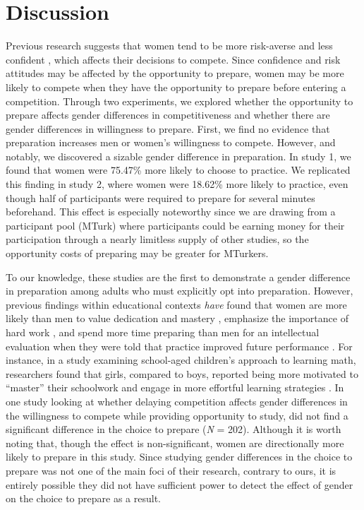\documentclass[a4paper, nobind]{templates/ociamthesis}
\begin{document}
\hypertarget{discussion}{%
\chapter{Discussion}\label{discussion}}

Previous research suggests that women tend to be more risk-averse \autocite{Croson2009,Dohmen2011b,Eckel2008,Bertrand2010a} and less confident \autocite{Bertrand2010,Lundeberg1994,Mobius2011,Barber2001,Croson2009}, which affects their decisions to compete. Since confidence and risk attitudes may be affected by the opportunity to prepare, women may be more likely to compete when they have the opportunity to prepare before entering a competition. Through two experiments, we explored whether the opportunity to prepare affects gender differences in competitiveness and whether there are gender differences in willingness to prepare. First, we find no evidence that preparation increases men or women's willingness to compete. However, and notably, we discovered a sizable gender difference in preparation. In study 1, we found that women were 75.47\% more likely to choose to practice. We replicated this finding in study 2, where women were 18.62\% more likely to practice, even though half of participants were required to prepare for several minutes beforehand. This effect is especially noteworthy since we are drawing from a participant pool (MTurk) where participants could be earning money for their participation through a nearly limitless supply of other studies, so the opportunity costs of preparing may be greater for MTurkers.

To our knowledge, these studies are the first to demonstrate a gender difference in preparation among adults who must explicitly opt into preparation. However, previous findings within educational contexts \emph{have} found that women are more likely than men to value dedication and mastery \autocite{Leslie2015,Kenney-Benson2006}, emphasize the importance of hard work \autocite{Mccrea2008,Hirt2009,Mccrea2008a}, and spend more time preparing than men for an intellectual evaluation when they were told that practice improved future performance \autocite{Kimble2005}. For instance, in a study examining school-aged children's approach to learning math, researchers found that girls, compared to boys, reported being more motivated to ``master'' their schoolwork and engage in more effortful learning strategies \autocite{Kenney-Benson2006}. In one study looking at whether delaying competition affects gender differences in the willingness to compete while providing opportunity to study, \textcite{Charness2020} did not find a significant difference in the choice to prepare (\emph{N} = 202). Although it is worth noting that, though the effect is non-significant, women are directionally more likely to prepare in this study. Since studying gender differences in the choice to prepare was not one of the main foci of their research, contrary to ours, it is entirely possible they did not have sufficient power to detect the effect of gender on the choice to prepare as a result.
\end{document}

